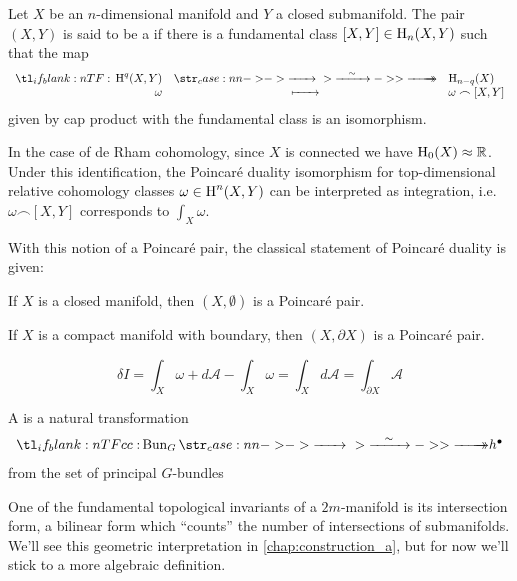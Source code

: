 
\begin{definition}\label{defn:poincare-pair}
	Let $X$ be an $n$-dimensional manifold and $Y$ a closed submanifold. The pair $(X,Y)$ is said to be a  if there is a fundamental class $[X, Y]\in \operatorname{H}_n(X,Y)$ such that the map
	\[
		\lkxfunc{}{\H^q(X,Y)}{\H_{n-q}(X)}{\omega}{\omega \frown [X, Y]}
	\]
	given by cap product with the fundamental class is an isomorphism.
\end{definition}

\begin{remark}\label{rmk:duality-integration}
In the case of de Rham cohomology, since $X$ is connected we have $\operatorname{H}_0(X)\approx \mathbb{R}$. Under this identification, the Poincar\'e duality isomorphism for top-dimensional relative cohomology classes $\omega\in \operatorname{H}^n(X,Y)$ can be interpreted as integration, i.e. $\omega\frown [X,Y]$ corresponds to $\int_X \omega$. 
\end{remark}

With this notion of a Poincar\'e pair, the classical statement of Poincar\'e duality is given:

\begin{theorem}\label{thm:poincare-duality}
	If $X$ is a closed manifold, then $(X,\emptyset)$ is a Poincar\'e pair.
\end{theorem}

\begin{theorem}\label{thm:poincare-lefschetz-duality}
	If $X$ is a compact manifold with boundary, then $(X,\partial X)$ is a Poincar\'e pair.
\end{theorem}

\[
	\delta I = \int_X \omega + d\mathcal{A} - \int_X \omega =\int_X d\mathcal{A} =\int_{\partial X} \mathcal{A}
\]

\begin{definition*}
	A  is a natural transformation 
	\[
		\lkxfunc{c}{\Bun_{G}}{h^\bullet}
	\]
	from the set of principal $G$-bundles
\end{definition*}

One of the fundamental topological invariants of a $2m$-manifold is its intersection form, a bilinear form which ``counts'' the number of intersections of submanifolds. We'll see this geometric interpretation in \cref{chap:construction_a}, but for now we'll stick to a more algebraic definition.

